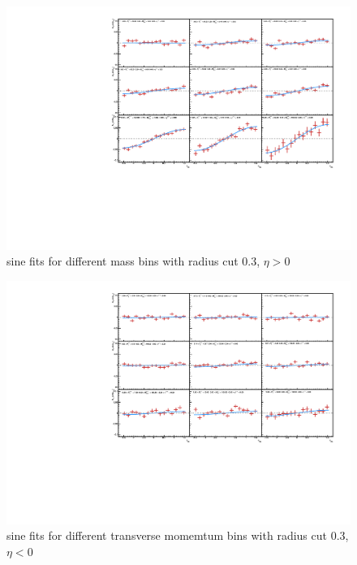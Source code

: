 \documentclass[letterpaper, abstract = on,listof=totoc, bibliography=totoc]{scrreprt}
\begin{document}
\begin{appendices}
\begin{figure}
\begin{center}
\includegraphics[width = 1\textwidth]{cone3Vm_hiEtaV2.pdf}
\caption[sine fits for different mass bins with radius cut 0.3]{sine fits for different mass bins with radius cut 0.3, $\eta > 0$}
\label{}
\end{center}
\end{figure}

\begin{figure}
\begin{center}
\includegraphics[width = 1\textwidth]{cone3Vpt_loEtaV2.pdf}
\caption[sine fits for different transverse momemtum bins with radius cut 0.3]{sine fits for different transverse momemtum bins with radius cut 0.3, $\eta < 0$}
\label{}
\end{center}
\end{figure}


\end{appendices}
\end{document}

